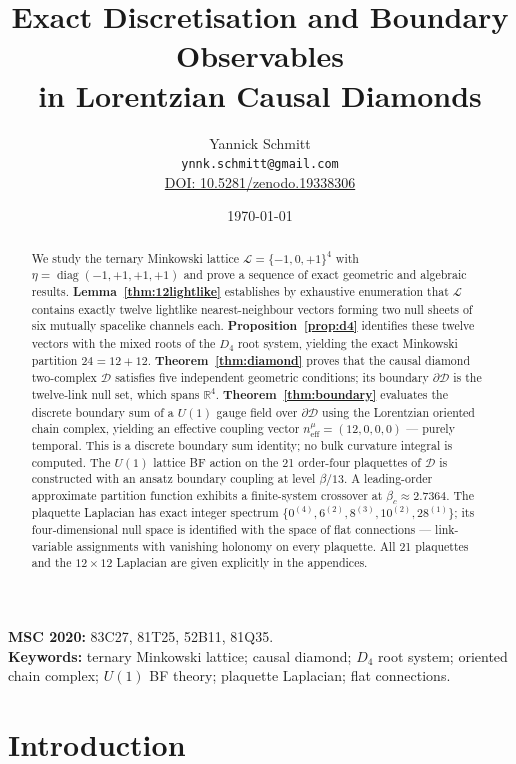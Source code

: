 \documentclass[12pt, a4paper]{article}
\title{\Large\bfseries Exact Discretisation and Boundary Observables\\[4pt]
       in Lorentzian Causal Diamonds}
\author{Yannick Schmitt \\ 
\texttt{ynnk.schmitt@gmail.com} \\
\vspace{4pt} 
\href{https://doi.org/10.5281/zenodo.19338306}{DOI: 10.5281/zenodo.19338306}}
\date{\today}
\theoremstyle{plain}
\theoremstyle{definition}
\theoremstyle{remark}
\newcommand{\Lat}{\mathscr{L}}
\newcommand{\CD}{\mathscr{D}}
\newcommand{\BdyCD}{\partial\mathscr{D}}
\newcommand{\Cstar}{\beta_c}
\newcommand{\neff}{n^\mu_{\mathrm{eff}}}
\newcommand{\R}{\mathbb{R}}
\begin{document}
\maketitle

\begin{abstract}
We study the ternary Minkowski lattice
$\Lat = \{-1,0,+1\}^4$ with
$\eta = \operatorname{diag}(-1,+1,+1,+1)$
and prove a sequence of exact geometric and algebraic results.
\textbf{Lemma~\ref{thm:12lightlike}} establishes by exhaustive
enumeration that $\Lat$ contains exactly twelve lightlike
nearest-neighbour vectors forming two null sheets of six mutually
spacelike channels each.
\textbf{Proposition~\ref{prop:d4}} identifies these twelve vectors
with the mixed roots of the $D_4$ root system, yielding the exact
Minkowski partition $24 = 12 + 12$.
\textbf{Theorem~\ref{thm:diamond}} proves that the causal diamond
two-complex $\CD$ satisfies five independent geometric conditions;
its boundary $\BdyCD$ is the twelve-link null set, which spans $\R^4$.
\textbf{Theorem~\ref{thm:boundary}} evaluates the discrete boundary
sum of a $U(1)$ gauge field over $\BdyCD$ using the Lorentzian
oriented chain complex, yielding an effective coupling vector
$\neff = (12,0,0,0)$ --- purely temporal.
This is a discrete boundary sum identity; no bulk curvature integral
is computed.
The $U(1)$ lattice BF action on the 21 order-four plaquettes of $\CD$
is constructed with an ansatz boundary coupling at level $\beta/13$.
A leading-order approximate partition function exhibits a
finite-system crossover at $\Cstar \approx 2.7364$.
The plaquette Laplacian has exact integer spectrum
$\{0^{(4)}, 6^{(2)}, 8^{(3)}, 10^{(2)}, 28^{(1)}\}$;
its four-dimensional null space is identified with the space of
flat connections --- link-variable assignments with vanishing
holonomy on every plaquette.
All 21 plaquettes and the $12\times12$ Laplacian are given
explicitly in the appendices.
\end{abstract}

\tableofcontents

\bigskip\noindent
\textbf{MSC 2020:} 83C27, 81T25, 52B11, 81Q35.\\[2pt]
\textbf{Keywords:} ternary Minkowski lattice; causal diamond;
$D_4$ root system; oriented chain complex; $U(1)$ BF theory;
plaquette Laplacian; flat connections.

\section{Introduction}\label{sec:intro}
\end{document}
